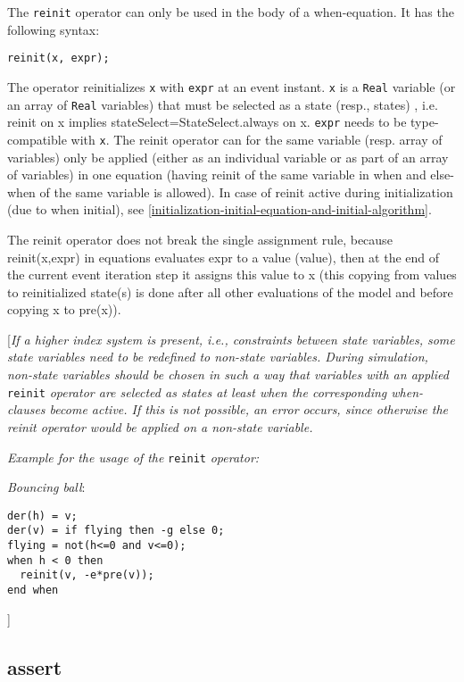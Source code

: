The \lstinline!reinit! operator can only be used in the body of a when-equation. It
has the following syntax:

\begin{lstlisting}[language=modelica]
reinit(x, expr);
\end{lstlisting}

The operator reinitializes \lstinline!x! with \lstinline!expr! at an event instant. \lstinline!x! is a
\lstinline!Real!
variable (or an array of \lstinline!Real! variables) that must be selected as a
state (resp., states) , i.e. reinit on x implies
stateSelect=StateSelect.always on x. \lstinline!expr! needs to be type-compatible
with \lstinline!x!. The reinit operator can for the same variable (resp. array of
variables) only be applied (either as an individual variable or as part
of an array of variables) in one equation (having reinit of the same
variable in when and else-when of the same variable is allowed). In case
of reinit active during initialization (due to when initial), see
\autoref{initialization-initial-equation-and-initial-algorithm}.

The reinit operator does not break the single assignment rule, because
reinit(x,expr) in equations evaluates expr to a value (value), then at
the end of the current event iteration step it assigns this value to x
(this copying from values to reinitialized state(s) is done after all
other evaluations of the model and before copying x to pre(x)).

{[}\emph{If a higher index system is present, i.e., constraints between
state variables, some state variables need to be redefined to non-state
variables. During simulation, non-state variables should be chosen in
such a way that variables with an applied} \lstinline!reinit! \emph{operator are
selected as states at least when the corresponding when-clauses become
active. If this is not possible, an error occurs, since otherwise the
reinit operator would be applied on a non-state variable.}

\emph{Example for the usage of the} \lstinline!reinit! \emph{operator:}

\emph{Bouncing ball}:
\begin{lstlisting}[language=modelica]
der(h) = v;
der(v) = if flying then -g else 0;
flying = not(h<=0 and v<=0);
when h < 0 then
  reinit(v, -e*pre(v));
end when
\end{lstlisting}

{]}

\subsection{assert}

